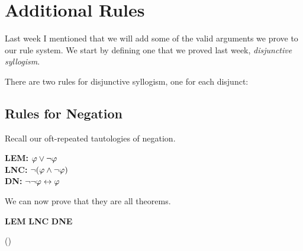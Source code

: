 
\section{Additional Rules}

Last week I mentioned that we will add some of the valid arguments we prove
to our rule system. We start by defining one that we proved last week,
\emph{disjunctive syllogism}.

\begin{fitchrule}
  \label{def:disjunctive-syllogism-rule}
  \leavevmode
  There are two rules for disjunctive syllogism, one for each disjunct:\\
\end{fitchrule}

\subsection{Rules for Negation}

Recall our oft-repeated tautologies of negation.

\begin{center}
    \textbf{LEM:} $\varphi\vee\neg\varphi$         \\
    \textbf{LNC:} $\neg(\varphi\wedge\neg\varphi)$ \\
    \textbf{DN:} $\neg\neg\varphi\leftrightarrow\varphi$    \\
\end{center}

We can now prove that they are all theorems.

\begin{center}
  \eproves\textbf{LEM}
  \eproves\textbf{LNC}
  \eproves\textbf{DNE}
\end{center}


\begin{table}
  \label{proof:lem}
  \begin{fitchproof}
    \open
     {\enot(\ephi\eor\enot\ephi)} 
    \open
     {\ephi}                      
     {\ephi\eor\enot\ephi}        
     {\ebot}                      
    \close
     {\enot\ephi}                 
     {\ephi\eor\enot\ephi}        
     {\ebot}                      
    \close
     {\ephi\eor\enot\ephi}        
  \end{fitchproof}
  \caption{Proof of \textbf{LEM}}
\end{table}

